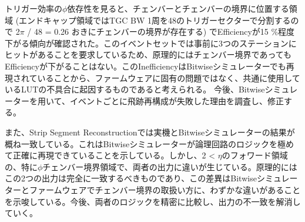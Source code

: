 トリガー効率の$\phi$依存性を見ると、チェンバーとチェンバーの境界に位置する領域 (エンドキャップ領域ではTGC BW 1周を48のトリガーセクターで分割するので 2$\pi$ / 48 = 0.26 おきにチェンバーの境界が存在する) でEfficiencyが15 \%程度下がる傾向が確認された。このイベントセットでは事前に3つのステーションにヒットがあることを要求しているため、原理的にはチェンバー境界であってもEfficiencyが下がることはない。このInefficiencyはBitwiseシミュレーターでも再現されていることから、ファームウェアに固有の問題ではなく、共通に使用しているLUTの不具合に起因するものであると考えられる。
今後、Bitwiseシミュレーターを用いて、イベントごとに飛跡再構成が失敗した理由を調査し、修正する。

また、Strip Segment Reconstructionでは実機とBitwiseシミュレーターの結果が概ね一致している。これはBitwiseシミュレーターが論理回路のロジックを極めて正確に再現できていることを示している。しかし、2 < $\eta$のフォワード領域の、特に$\phi$チェンバー境界領域で、両者の出力に違いが生じている。原理的にはこの2つの出力は完全に一致するべきものであり、この差異はBitwiseシミュレーターとファームウェアでチェンバー境界の取扱い方に、わずかな違いがあることを示唆している。今後、両者のロジックを精密に比較し、出力の不一致を解消していく。

